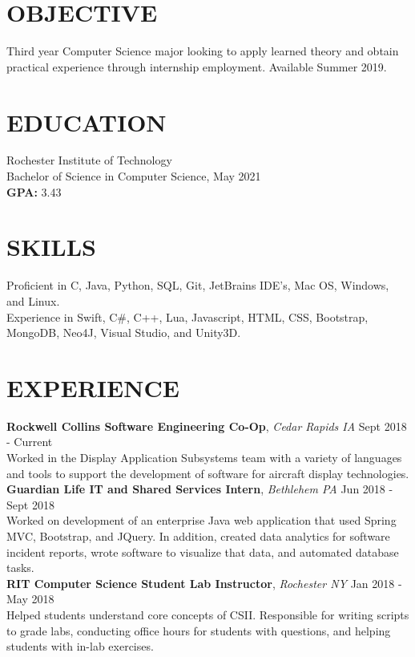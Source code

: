 \address{(484) 554-8487\\ emp9173@rit.edu}

\begin{resume}

\setmainfont[
 BoldFont={Helvetica Neue Bold}, 
 ItalicFont={Helvetica Neue Italic},
 BoldItalicFont={Helvetica Neue Bold Italic}
 ]{Helvetica Neue}



\section{OBJECTIVE}
Third year Computer Science major looking to apply learned theory and obtain practical experience through internship employment. Available Summer 2019.

\section{EDUCATION} 
 Rochester Institute of Technology \\
 Bachelor of Science in Computer Science, May 2021\\
 \textbf{GPA:} 3.43
 
\section{SKILLS}
Proficient in C, Java, Python, SQL, Git, JetBrains IDE’s, Mac OS, Windows, and Linux. \\
Experience in Swift, C\#, C++, Lua, Javascript, HTML, CSS, Bootstrap, MongoDB, Neo4J, Visual Studio, and Unity3D.
 
\section{EXPERIENCE} 
\textbf{Rockwell Collins Software Engineering Co-Op}, \textit{Cedar Rapids IA} \hfill Sept 2018 - Current \\
Worked in the Display Application Subsystems team with a variety of languages and tools to support the development of software for aircraft display technologies.\\ [10pt]
\textbf{Guardian Life IT and Shared Services Intern}, \textit{Bethlehem PA} \hfill Jun 2018 - Sept 2018 \\
Worked on development of an enterprise Java web application that used Spring MVC, Bootstrap, and JQuery.  In addition, created
data analytics for software incident reports, wrote software to visualize that data, and automated database tasks.\\ [10pt]
\textbf{RIT Computer Science Student Lab Instructor}, \textit{Rochester NY} \hfill Jan 2018 - May 2018 \\
Helped students understand core concepts of CSII. Responsible for writing scripts
to grade labs, conducting office hours for students with questions, and helping students
with in-lab exercises.


\end{resume}
